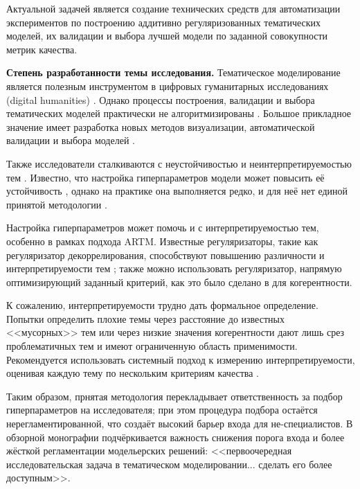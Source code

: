 Актуальной задачей является создание технических средств для автоматизации экспериментов по построению аддитивно регуляризованных тематических моделей, их валидации и выбора лучшей модели по заданной совокупности метрик качества. 

\textbf{Степень разработанности темы исследования.}
Тематическое моделирование является полезным инструментом в цифровых гуманитарных исследованиях (digital humanities) \cite{grimmer2013text,paakkonen2020humanistic}. Однако процессы построения, валидации и выбора тематических моделей практически не алгоритмизированы \cite{paakkonen2020humanistic}. Большое прикладное значение имеет разработка новых методов визуализации, автоматической валидации и выбора моделей \cite{dh_sea}.

Также исследователи сталкиваются с неустойчивостью \cite{mantyla2018measuring} и неинтерпретируемостью тем \cite{boydcare}. Известно, что настройка гиперпараметров модели может повысить её устойчивость \cite{agrawal2018wrong}, однако на практике она выполняется редко, и для неё нет единой принятой методологии  \cite{agrawal2018wrong,chen2016survey}.

Настройка гиперпараметров может помочь и с интерпретируемостью тем, особенно в рамках подхода ARTM. Известные регуляризаторы, такие как регуляризатор декоррелирования, способствуют повышению различности и интерпретируемости тем \cite{popov_hier}; также можно использовать  регуляризатор, напрямую оптимизирующий заданный критерий, как это было сделано в \cite{4keys} для когерентности.

К сожалению, интерпретируемости трудно дать формальное определение. Попытки определить плохие темы через расстояние до известных <<мусорных>> тем или через низкие значения когерентности дают лишь срез проблематичных тем и имеют ограниченную область применимости\cite{boydcare}. Рекомендуется использовать системный подход к измерению интерпретируемости, оценивая каждую тему по нескольким критериям качества \cite{fan2019assessing}.

Таким образом, прнятая методология перекладывает ответственность за подбор гиперпараметров на исследователя; при этом процедура подбора остаётся нерегламентированной, что создаёт высокий барьер входа для не-специалистов. 
В обзорной монографии \cite{fntir2017applications} подчёркивается важность снижения порога входа и более жёсткой регламентации модельерских решений: <<первоочередная исследовательская задача в тематическом моделировании... сделать его более доступным>>.

